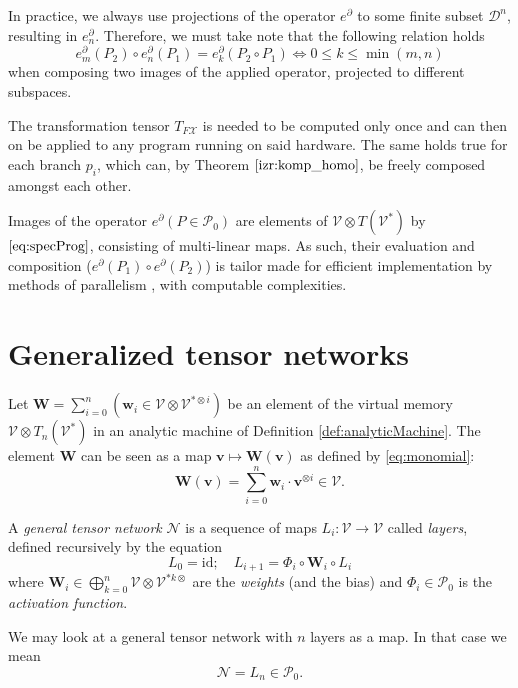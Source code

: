 \documentclass[smallcondensed]{svjour3}
\newcommand{\bfW}{\mathbf{W}}
\newcommand{\bfw}{\mathbf{w}}
\newcommand{\VV}{\mathcal{V}}
\newcommand{\NN}{\mathcal{N}}
\newcommand{\vv}{\mathbf{v}}
\newcommand{\X}{\mathcal{X}}
\newcommand{\dP}{\mathcal{P}}
\newcommand{\D}{\partial}
\newcommand{\DD}{\mathcal{D}}
\begin{document}
\begin{remark}
In practice, we always use projections of the operator $e^\D$ to some finite subset $\DD^n$, resulting in $e^\D_n$. Therefore, we must take note that the following relation holds
\begin{equation}
e^\D_m(P_2)\circ e^\D_n(P_1)=e^\D_k(P_2\circ P_1)\iff 0\le k\le \min(m,n)
\end{equation}
when composing two images of the applied operator, projected to different subspaces.
\end{remark}

The transformation tensor $T_{F\X}$ is needed to be computed only once and can then on be applied to any program running on said hardware. The same holds true for each branch $p_i$, which can, by Theorem $\ref{izr:komp_homo}$, be freely composed amongst each other.

\begin{proposition}\label{clm:paralel}
Images of the operator $e^\D (P\in\dP_0)$ are elements of $\VV\otimes T(\VV^*)$ by $\eqref{eq:specProg}$, consisting of multi-linear maps. As such, their evaluation and composition ($e^\D(P_1)\circ e^\D(P_2)$) is tailor made for efficient implementation by methods of parallelism \cite{TensorGPU}, with computable complexities.
\end{proposition}

\section{Generalized tensor networks}\label{sec:generalTensorNet}

Let $\bfW=\sum\limits_{i=0}^n(\bfw_i\in \VV\otimes \VV^{*\otimes i})$ be an element of the virtual memory $\VV\otimes T_n(\VV^*)$ in an
analytic machine of Definition \ref{def:analyticMachine}. The element $\bfW$ can
be seen as a map 
$\vv\mapsto \bfW(\vv)$ as defined by \eqref{eq:monomial}:
\begin{equation}
\bfW(\vv)=\sum\limits_{i=0}^n\bfw_i\cdot\vv^{\otimes i}\in \VV.
\end{equation}

\begin{definition}
  \label{def:tensor_network}
A \emph{general tensor network} $\NN$ is a sequence of maps $L_i:\VV\to \VV$  called
\emph{layers}, defined recursively by the equation 
\begin{equation}
L_0=\mathrm{id};\quad L_{i+1}=\Phi_i\circ\mathbf{W}_i\circ L_i
\end{equation}
where $\mathbf{W}_i\in \bigoplus\limits_{k=0}^n\VV\otimes \VV^{*k\otimes}$ are
the \emph{weights} (and the bias) and $\Phi_i\in\dP_0$ is the \emph{activation
  function}.
\end{definition}
We may look at a general tensor network with $n$ layers as a map. In that case
we mean
\begin{equation}
\NN=L_n\in\dP_0.
\end{equation}
\end{document}

